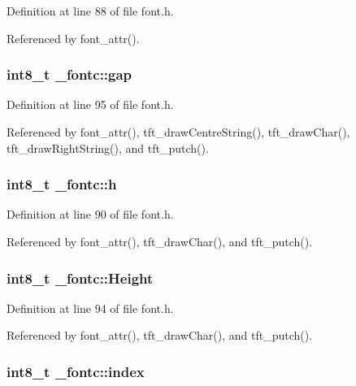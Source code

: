 Definition at line 88 of file font.\-h.



Referenced by font\-\_\-attr().

\hypertarget{struct__fontc_a38c23e7e200346fce3777d4efa30488f}{
\subsubsection[{gap}]{\setlength{\rightskip}{0pt plus 5cm}int8\-\_\-t \-\_\-fontc\-::gap}}\label{struct__fontc_a38c23e7e200346fce3777d4efa30488f}


Definition at line 95 of file font.\-h.



Referenced by font\-\_\-attr(), tft\-\_\-draw\-Centre\-String(), tft\-\_\-draw\-Char(), tft\-\_\-draw\-Right\-String(), and tft\-\_\-putch().

\hypertarget{struct__fontc_a9feb8c838dfc1d4eebb15c8e53981944}{
\subsubsection[{h}]{\setlength{\rightskip}{0pt plus 5cm}int8\-\_\-t \-\_\-fontc\-::h}}\label{struct__fontc_a9feb8c838dfc1d4eebb15c8e53981944}


Definition at line 90 of file font.\-h.



Referenced by font\-\_\-attr(), tft\-\_\-draw\-Char(), and tft\-\_\-putch().

\hypertarget{struct__fontc_a98f97c237dfb1027c38813a17ef6dcd6}{
\subsubsection[{Height}]{\setlength{\rightskip}{0pt plus 5cm}int8\-\_\-t \-\_\-fontc\-::\-Height}}\label{struct__fontc_a98f97c237dfb1027c38813a17ef6dcd6}


Definition at line 94 of file font.\-h.



Referenced by font\-\_\-attr(), tft\-\_\-draw\-Char(), and tft\-\_\-putch().

\hypertarget{struct__fontc_a7cc0370744ff7ea964054d36917c9a2f}{
\subsubsection[{index}]{\setlength{\rightskip}{0pt plus 5cm}int8\-\_\-t \-\_\-fontc\-::index}}\label{struct__fontc_a7cc0370744ff7ea964054d36917c9a2f}


